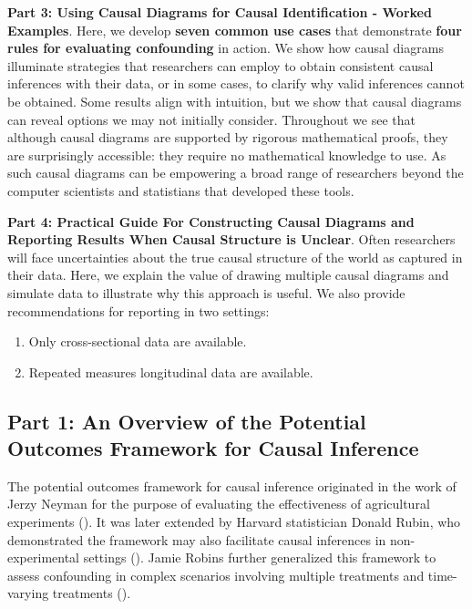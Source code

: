 \documentclass[
  singlecolumn]{article}
\providecommand{\tightlist}{%
  \setlength{\itemsep}{0pt}\setlength{\parskip}{0pt}}\usepackage{longtable,booktabs,array}
\begin{document}
\textbf{Part 3: Using Causal Diagrams for Causal Identification - Worked
Examples}. Here, we develop \textbf{seven common use cases} that
demonstrate \textbf{four rules for evaluating confounding} in action. We
show how causal diagrams illuminate strategies that researchers can
employ to obtain consistent causal inferences with their data, or in
some cases, to clarify why valid inferences cannot be obtained. Some
results align with intuition, but we show that causal diagrams can
reveal options we may not initially consider. Throughout we see that
although causal diagrams are supported by rigorous mathematical proofs,
they are surprisingly accessible: they require no mathematical knowledge
to use. As such causal diagrams can be empowering a broad range of
researchers beyond the computer scientists and statistians that
developed these tools.

\textbf{Part 4: Practical Guide For Constructing Causal Diagrams and
Reporting Results When Causal Structure is Unclear}. Often researchers
will face uncertainties about the true causal structure of the world as
captured in their data. Here, we explain the value of drawing multiple
causal diagrams and simulate data to illustrate why this approach is
useful. We also provide recommendations for reporting in two settings:

\begin{enumerate}
\def\labelenumi{(\roman{enumi})}
\tightlist
\item
  Only cross-sectional data are available.
\item
  Repeated measures longitudinal data are available.
\end{enumerate}

\subsection{Part 1: An Overview of the Potential Outcomes Framework for
Causal Inference}\label{sec-part1}

The potential outcomes framework for causal inference originated in the
work of Jerzy Neyman for the purpose of evaluating the effectiveness of
agricultural experiments (). It
was later extended by Harvard statistician Donald Rubin, who
demonstrated the framework may also facilitate causal inferences in
non-experimental settings (). Jamie
Robins further generalized this framework to assess confounding in
complex scenarios involving multiple treatments and time-varying
treatments ().
\end{document}
